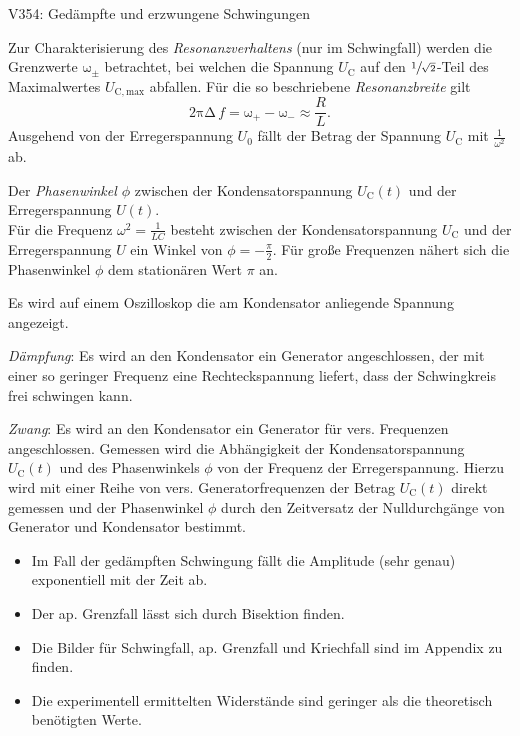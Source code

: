 \begin{Versuch}{V354: Gedämpfte und erzwungene Schwingungen}
\begin{Theorie}
		Zur Charakterisierung des \emph{Resonanzverhaltens} 
		(nur im Schwingfall) werden die Grenzwerte
		$\mathup{\omega_\pm}$ betrachtet, 
		bei welchen die Spannung $U_\mathup{C}$ auf den 
		$\sfrac{1}{\sqrt{2}}$-Teil des Maximalwertes $U_\mathup{C,max}$ abfallen.  
		Für die so beschriebene \emph{Resonanzbreite} gilt
		\begin{equation}
			\mathup{2\pi\Delta}\, f = \mathup{ω_+} − \mathup{ω_−} \approx \frac{{R}}{{L}}.
			\label{eq:deltaf}
		\end{equation}
		Ausgehend von der  Erregerspannung $U_0$ fällt der Betrag der Spannung $U_\mathup{C}$  mit $\frac{1}{\omega^2}$ ab.

		Der \emph{Phasenwinkel $\phi$} zwischen der Kondensatorspannung $U_\mathup{C}(t)$ und der Erregerspannung $U(t)$.\\
		Für die Frequenz $\omega^2 = \frac{1}{{LC}}$ besteht zwischen der Kondensatorspannung $U_\text{C}$ und der Erregerspannung $U$ ein Winkel von $\phi =-\frac{\pi}{2}$.
		Für große Frequenzen nähert sich die Phasenwinkel $\phi$ dem stationären Wert $\pi$ an.

	\end{Theorie}
    
    \begin{Durchführung}
        Es wird auf einem Oszilloskop die am Kondensator anliegende Spannung angezeigt.

        \emph{Dämpfung}:
        Es wird an den Kondensator ein Generator angeschlossen, der mit einer so geringer Frequenz eine Rechteckspannung liefert, dass der Schwingkreis frei schwingen kann.
       
        \emph{Zwang}:
        Es wird an den Kondensator ein Generator für vers. Frequenzen angeschlossen.
        Gemessen wird die Abhängigkeit der Kondensatorspannung $U_\text{C}(t)$ und des Phasenwinkels $\phi$ von der Frequenz der Erregerspannung.
        Hierzu wird mit einer Reihe von vers. Generatorfrequenzen der Betrag $U_\text{C}(t)$ direkt gemessen und der Phasenwinkel $\phi$ durch den Zeitversatz der Nulldurchgänge von Generator und Kondensator bestimmt.
    \end{Durchführung}        
    
    \begin{Auswertung}
    	\begin{itemize}
    		\item Im Fall der gedämpften Schwingung fällt die Amplitude (sehr genau) exponentiell mit der Zeit ab.
    		\item Der ap. Grenzfall lässt sich durch Bisektion finden.
    		\item Die Bilder für Schwingfall, ap. Grenzfall und Kriechfall sind im Appendix zu finden.
    		\item Die experimentell ermittelten Widerstände sind geringer als die theoretisch benötigten Werte.


\end{itemize}
\end{Auswertung}
\end{Versuch}
